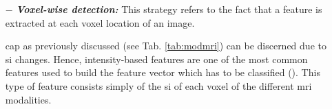\begin{enumerate}[leftmargin=*]

\item[$-$] \textbf{\textit{Voxel-wise detection:}} This strategy refers to the fact that a feature is extracted at each voxel location of an image.

\ac{cap} as previously discussed (see Tab. \ref{tab:modmri}) can be discerned due to \ac{si} changes. Hence, intensity-based features are one of the most common features used to build the feature vector which has to be classified (\cite{Ampeliotis2007,Ampeliotis2008,Artan2009,Artan2010,Chan2003,Langer2009,Liu2009,Niaf2011,Niaf2012,Viswanath2008a,Viswanath2011}). This type of feature consists simply of the \ac{si} of each voxel of the different \ac{mri} modalities.


\end{enumerate}
